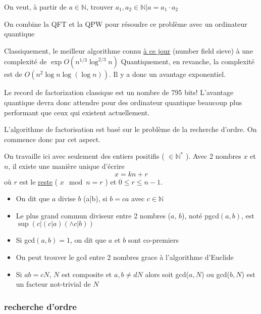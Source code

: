 On veut, à partir de $a\in \mathds{N}$, trouver $a_1, a_2 \in \mathds{N}|a = a_1\cdot a_2$  

On combine la QFT et la QPW pour résoudre ce problème avec un ordinateur quantique

\begin{tcolorbox}[title=]
	Classiquement, le meilleur algorithme connu \underline{à ce jour} (number field sieve) à une complexité de $\exp{O(n^{1/3} \log^{2/3} n)}$ 
	Quantiquement, en revanche, la complexité est de $O(n^2\log n \log(\log n))$. Il y a donc un avantage exponentiel.  
\end{tcolorbox}

\begin{tcolorbox}[title=]
	Le record de factorization classique est un nombre de 795 bits! L'avantage quantique devra donc attendre pour des ordinateur quantique beaucoup plus performant que ceux qui existent actuellement.
	
\end{tcolorbox}

L'algorithme de factorisation est basé sur le problème de la recherche d'ordre. On commence donc par cet aspect.



\begin{tcolorbox}[title=Rappel de notions d'arithmétique]
	On travaille ici avec seulement des entiers  positifis ( $\in\mathds{N}^*$  ). Avec 2 nombres $x$ et $n$, il existe une manière unique d'écrire $$x = kn + r$$ où $r$ est le \underline{reste} ( $x \mod n = r$  ) et $0 \leq r\leq n-1. $     

\begin{itemize}
	\item On dit que $a$ divise $b$ (a|b), si $b=ca$ avec $c \in \mathds{N}$
	\item Le plus grand commun diviseur entre 2 nombres ($a,\, b$), noté pgcd$(a,b)$, est $\sup(c | (c|a) (\wedge c|b))$  
	\item Si gcd$(a,b) =1$, on dit que $a$ et $b$ sont co-premiers  
	\item On peut trouver le gcd entre 2 nombres grace à l'algorithme d'Euclide 
	\item Si $ab = cN$, $N$ est composite et $a,b \neq dN$ alors soit gcd($a,N$) ou gcd($b,N$) est un facteur not-trivial de $N$   
\end{itemize}

\end{tcolorbox}

\subsubsection{recherche d'ordre}

